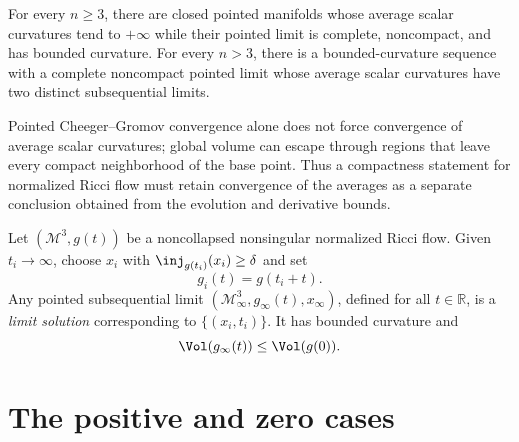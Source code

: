 \begin{example}
\label{ex:chow-iv-average-scalar-curvature-pathologies}
For every $n\ge3$, there are closed pointed manifolds whose average scalar
curvatures tend to $+\infty$ while their pointed limit is complete,
noncompact, and has bounded curvature.  For every $n>3$, there is a
bounded-curvature sequence with a complete noncompact pointed limit whose
average scalar curvatures have two distinct subsequential limits.
\end{example}

\begin{remark}
\label{rem:chow-iv-compactness-global-averages}
Pointed Cheeger--Gromov convergence alone does not force convergence of
average scalar curvatures; global volume can escape through regions that
leave every compact neighborhood of the base point.  Thus a compactness
statement for normalized Ricci flow must retain convergence of the averages
as a separate conclusion obtained from the evolution and derivative bounds.
\end{remark}

\begin{definition}
\label{def:chow-iv-nrf-limit-solution}
Let $(\mathcal M^3,g(t))$ be a noncollapsed nonsingular normalized Ricci
flow.  Given $t_i\to\infty$, choose $x_i$ with
$\inj_{g(t_i)}(x_i)\ge\delta$ and set
\[
 g_i(t)=g(t_i+t).
\]
Any pointed subsequential limit
$(\mathcal M_\infty^3,g_\infty(t),x_\infty)$, defined for all
$t\in\mathbb R$, is a \emph{limit solution} corresponding to
$\{(x_i,t_i)\}$.  It has bounded curvature and
\[
 \Vol(g_\infty(t))\le\Vol(g(0)).
\]
\end{definition}

\section{The positive and zero cases}

